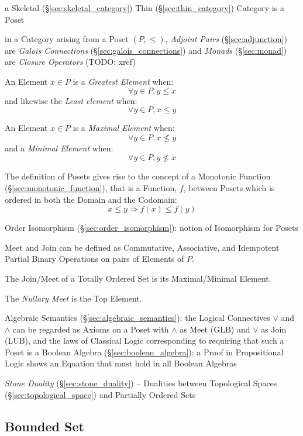 a Skeletal (\S\ref{sec:skeletal_category}) Thin (\S\ref{sec:thin_category})
Category is a Poset

in a Category arising from a Poset $(P,\leq)$,
\emph{Adjoint Pairs} (\S\ref{sec:adjunction}) are \emph{Galois Connections}
(\S\ref{sec:galois_connections}) and \emph{Monads} (\S\ref{sec:monad}) are
\emph{Closure Operators} (TODO: xref)

An Element $x \in P$ is a \emph{Greatest Element} when:
\[
  \forall y \in P, y \leq x
\]
and likewise the \emph{Least element} when:
\[
  \forall y \in P, x \leq y
\]

An Element $x \in P$ is a \emph{Maximal Element} when:
\[
  \forall y \in P, x \nleq y
\]
and a \emph{Minimal Element} when:
\[
  \forall y \in P, y \nleq x
\]

The definition of Posets gives rise to the concept of a Monotonic
Function (\S\ref{sec:monotonic_function}), that is a Function, $f$,
between Posets which is ordered in both the Domain and the Codomain:
\[
  x \leq y \Rightarrow f(x) \leq f(y)
\]

Order Isomorphism (\S\ref{sec:order_isomorphism}): notion of
Isomorphism for Posets


Meet and Join can be defined as Commutative, Associative, and
Idempotent Partial Binary Operations on pairs of Elements of $P$.

The Join/Meet of a Totally Ordered Set is its Maximal/Minimal Element.

The \emph{Nullary Meet} is the Top Element.

\fist Algebraic Semantics (\S\ref{sec:algebraic_semantics}): the Logical
Connectives $\vee$ and $\wedge$ can be regarded as Axioms on a Poset with
$\wedge$ as Meet (GLB) and $\vee$ as Join (LUB), and the laws of Classical
Logic corresponding to requiring that such a Poset is a Boolean Algebra
(\S\ref{sec:boolean_algebra}); a Proof in Propositional Logic shows an Equation
that must hold in all Boolean Algebras

\fist \emph{Stone Duality} (\S\ref{sec:stone_duality}) -- Dualities between
Topological Spaces (\S\ref{sec:topological_space}) and Partially Ordered Sets



\subsection{Bounded Set}\label{sec:bounded_set}

